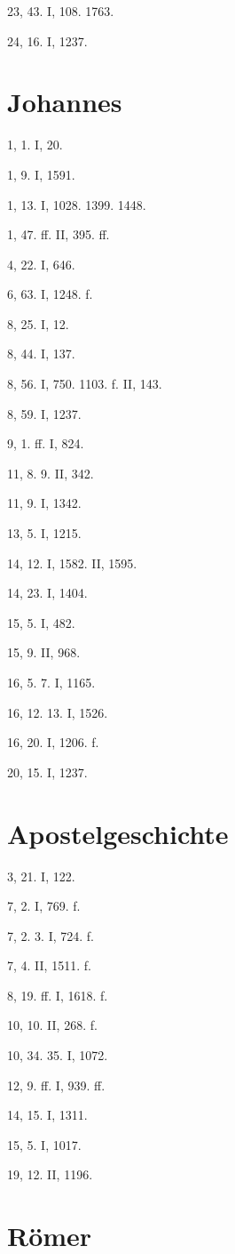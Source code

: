 23, 43. I, 108. 1763.

24, 16. I, 1237.

\section{Johannes}

1, 1. I, 20.

1, 9. I, 1591.

1, 13. I, 1028. 1399. 1448.

1, 47. ff. II, 395. ff.

4, 22. I, 646.

6, 63. I, 1248. f.

8, 25. I, 12.

8, 44. I, 137.

8, 56. I, 750. 1103. f. II, 143.

8, 59. I, 1237.

9, 1. ff. I, 824.

11, 8. 9. II, 342.

11, 9. I, 1342.

13, 5. I, 1215.

14, 12. I, 1582. II, 1595.

14, 23. I, 1404.

15, 5. I, 482.

15, 9. II, 968.

16, 5. 7. I, 1165.

16, 12. 13. I, 1526.

16, 20. I, 1206. f.

20, 15. I, 1237.

\section{Apostelgeschichte}

3, 21. I, 122.

7, 2. I, 769. f.

7, 2. 3. I, 724. f.

7, 4. II, 1511. f.

8, 19. ff. I, 1618. f.

10, 10. II, 268. f.

10, 34. 35. I, 1072.

12, 9. ff. I, 939. ff.

14, 15. I, 1311.

15, 5. I, 1017.

19, 12. II, 1196.

\section{Römer}

